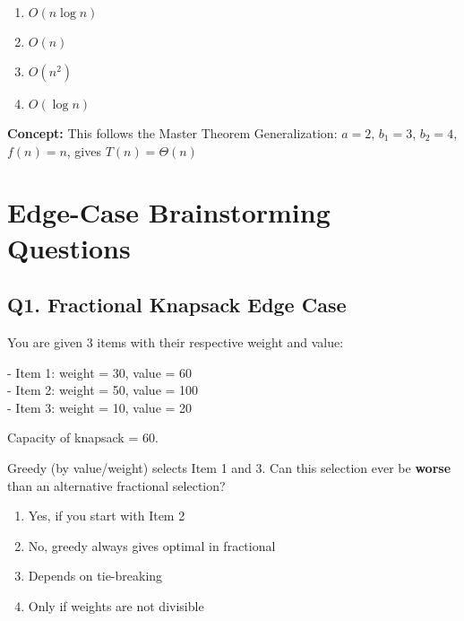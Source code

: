 \begin{enumerate}[label=(\alph*)]
    \item \(O(n \log n)\) \quad
    \item \(O(n)\) \quad
    \item \(O(n^2)\) \quad
    \item \(O(\log n)\)
\end{enumerate}

\textbf{Concept:} This follows the Master Theorem Generalization: \(a = 2\), \(b_1 = 3\), \(b_2 = 4\), \(f(n) = n\), gives \(T(n) = \Theta(n)\)

\section{Edge-Case Brainstorming Questions}

\subsection*{Q1. Fractional Knapsack Edge Case}
You are given 3 items with their respective weight and value:

\begin{center}
- Item 1: weight = 30, value = 60  \\
- Item 2: weight = 50, value = 100  \\
- Item 3: weight = 10, value = 20  
\end{center}

Capacity of knapsack = 60.

Greedy (by value/weight) selects Item 1 and 3.  
Can this selection ever be \textbf{worse} than an alternative fractional selection?

\begin{enumerate}[label=(\alph*)]
    \item Yes, if you start with Item 2 
    \item No, greedy always gives optimal in fractional 
    \item Depends on tie-breaking 
    \item Only if weights are not divisible
\end{enumerate}

